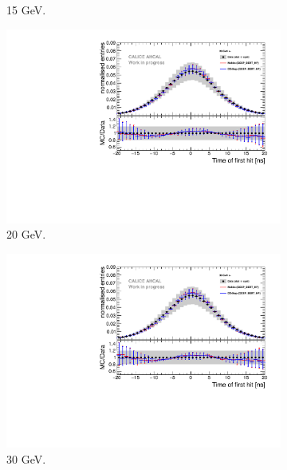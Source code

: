 \begin{figure}[htbp!]
\begin{subfigure}[t]{0.45\textwidth}
		\caption{15 GeV.}\label{fig:elec_sim_data_15GeV}
	\end{subfigure}
	\hfill
	\begin{subfigure}[t]{0.45\textwidth}
		\centering
		\includegraphics[width=1\textwidth]{chap5/fig_AHCAL_timing/Electrons/Comparison_SimData_Electrons20GeV.pdf}
		\caption{20 GeV.}\label{fig:elec_sim_data_20GeV}
	\end{subfigure}
	\hfill
	\begin{subfigure}[t]{0.45\textwidth}
		\centering
		\includegraphics[width=1\textwidth]{chap5/fig_AHCAL_timing/Electrons/Comparison_SimData_Electrons30GeV.pdf}
		\caption{30 GeV.}\label{fig:elec_sim_data_30GeV}
	\end{subfigure}
	\hfill
	\begin{subfigure}[t]{0.45\textwidth}
		\centering

\end{subfigure}
\end{figure}
